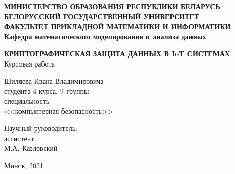  
 \begin{titlepage}
 	 \begin{center}
 		\textbf{
 			\small{МИНИСТЕРСТВО ОБРАЗОВАНИЯ РЕСПУБЛИКИ БЕЛАРУСЬ}\\
 			\vspace{0.5em}
 			\small{БЕЛОРУССКИЙ ГОСУДАРСТВЕННЫЙ УНИВЕРСИТЕТ}\\
 			\vspace{0.5em}
 			\small{ФАКУЛЬТЕТ ПРИКЛАДНОЙ МАТЕМАТИКИ И ИНФОРМАТИКИ}\\
 			\vspace{0.5em}
 			Кафедра математического моделирования и анализа данных\\
 		}
 	\end{center}
 	
 	\vspace{7em}
 	
 	\begin{center}
 		{\bf КРИПТОГРАФИЧЕСКАЯ ЗАЩИТА ДАННЫХ В IoT СИСТЕМАХ} \\
 		\vspace{5mm}
 		{ Курсовая работа}
 	\end{center}
 	
 	\vspace{8em}
 	
 	\begin{flushright}
 		Шиляева Ивана Владимировича\\
 		студента 4 курса, 9 группы\\
 		специальность\\
 		<<компьютерная безопасность>>
 	\end{flushright}
 	
 	\begin{flushright}
 		Научный руководитель:\\
 		ассистент\\
 		М.А. Казловский\\
 	\end{flushright}
 	
 	\vfill
 	
 	\begin{center}
 		{Минск, 2021}
 	\end{center}
 \end{titlepage}